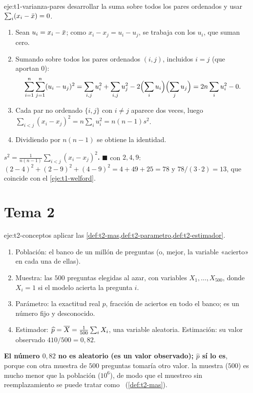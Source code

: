 \begin{solucion}{eje:t1-varianza-pares}
\planteamiento desarrollar la suma sobre todos los pares ordenados y usar $\sum_i(x_i-\bar{x})=0$.
\pasos
\begin{enumerate}[label=\arabic*.]
  \item Sean $u_i=x_i-\bar{x}$; como $x_i-x_j=u_i-u_j$, se trabaja con los $u_i$, que suman cero.
  \item Sumando sobre todos los pares ordenados $(i,j)$, incluidos $i=j$ (que aportan $0$):
  \[
  \sum_{i=1}^{n}\sum_{j=1}^{n}(u_i-u_j)^{2}=\sum_{i,j}u_i^{2}+\sum_{i,j}u_j^{2}-2\Bigl(\sum_iu_i\Bigr)\Bigl(\sum_ju_j\Bigr)=2n\sum_iu_i^{2}-0.
  \]
  \item Cada par no ordenado $\{i,j\}$ con $i\neq j$ aparece dos veces, luego $\sum_{i<j}(x_i-x_j)^{2}=n\sum_iu_i^{2}=n(n-1)s^{2}$.
  \item Dividiendo por $n(n-1)$ se obtiene la identidad.
\end{enumerate}
\resultado \textbf{$s^{2}=\frac{1}{n(n-1)}\sum_{i<j}(x_i-x_j)^{2}$.} $\blacksquare$
\comprobacion con $2,4,9$: $(2-4)^{2}+(2-9)^{2}+(4-9)^{2}=4+49+25=78$ y $78/(3\cdot2)=13$, que coincide con el \cref{eje:t1-welford}.
\end{solucion}

\section{Tema 2}

\begin{solucion}{eje:t2-conceptos}
\planteamiento aplicar las \cref{def:t2-mas,def:t2-parametro,def:t2-estimador}.
\pasos
\begin{enumerate}[label=\arabic*.]
  \item Población: el banco de un millón de preguntas (o, mejor, la variable «acierto» en cada una de ellas).
  \item Muestra: las $500$ preguntas elegidas al azar, con variables $X_1,\dots,X_{500}$, donde $X_i=1$ si el modelo acierta la pregunta $i$.
  \item Parámetro: la exactitud real $p$, fracción de aciertos en todo el banco; es un número fijo y desconocido.
  \item Estimador: $\widehat p=\overline{X}=\frac{1}{500}\sum_iX_i$, una variable aleatoria. Estimación: su valor observado $410/500=0{,}82$.
\end{enumerate}
\resultado \textbf{El número $0{,}82$ no es aleatorio (es un valor observado); $\widehat p$ sí lo es}, porque con otra muestra de $500$ preguntas tomaría otro valor.
\comprobacion la muestra ($500$) es mucho menor que la población ($10^{6}$), de modo que el muestreo sin reemplazamiento se puede tratar como \iid\ (\cref{def:t2-mas}).
\end{solucion}

